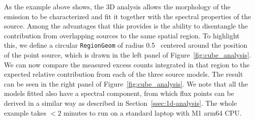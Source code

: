 \documentclass[longauth]{aa}
\newcommand{\todo}[1]{\textcolor{red}{TODO: #1}\PackageWarning{TODO:}{#1!}}
\newcommand{\code}[1]{\texttt{#1}}
\begin{document}
As the example above shows, the 3D analysis allows the
morphology of the emission to be characterized and fit it together with the spectral properties of
the source.  Among the advantages that this provides is the ability to
disentangle the contribution from overlapping sources to the same spatial
region. To highlight this, we define a circular \code{RegionGeom} of radius
0.5\textdegree~ centered around the position of the point source, which is drawn
in the left panel of Figure~\ref{fig:cube_analysis}. We can now compare the
measured excess counts integrated in that region to the expected relative
contribution from each of the three source models. The result can be seen in the right
panel of Figure~\ref{fig:cube_analysis}. We note that all the models fitted also have a
spectral component, from which flux points can be derived in a similar way as described
in Section~\ref{ssec:1d-analysis}. The whole example takes $<2$ minutes to run on a standard
laptop with M1 arm64 CPU.
\end{document}

